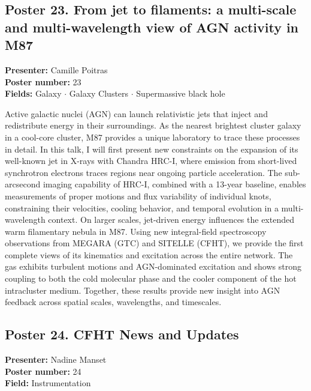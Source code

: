 \hypertarget{poster-abstract-talk-12}{}\label{poster-abstract-page-talk-12}
\subsection*{Poster 23. From jet to filaments: a multi-scale and multi-wavelength view of AGN activity in M87}
\textbf{Presenter:} Camille Poitras\\
\textbf{Poster number:} 23\\
\textbf{Fields:} Galaxy $\cdot$ Galaxy Clusters $\cdot$ Supermassive black hole

Active galactic nuclei (AGN) can launch relativistic jets that inject and redistribute energy in their surroundings. As the nearest brightest cluster galaxy in a cool-core cluster, M87 provides a unique laboratory to trace these processes in detail. In this talk, I will first present new constraints on the expansion of its well-known jet in X-rays with Chandra HRC-I, where emission from short-lived synchrotron electrons traces regions near ongoing particle acceleration. The sub-arcsecond imaging capability of HRC-I, combined with a 13-year baseline, enables measurements of proper motions and flux variability of individual knots, constraining their velocities, cooling behavior, and temporal evolution in a multi-wavelength context. On larger scales, jet-driven energy influences the extended warm filamentary nebula in M87. Using new integral-field spectroscopy observations from MEGARA (GTC) and SITELLE (CFHT), we provide the first complete views of its kinematics and excitation across the entire network. The gas exhibits turbulent motions and AGN-dominated excitation and shows strong coupling to both the cold molecular phase and the cooler component of the hot intracluster medium. Together, these results provide new insight into AGN feedback across spatial scales, wavelengths, and timescales.

\hypertarget{poster-abstract-talk-155}{}\label{poster-abstract-page-talk-155}
\subsection*{Poster 24. CFHT News and Updates}
\textbf{Presenter:} Nadine Manset\\
\textbf{Poster number:} 24\\
\textbf{Field:} Instrumentation

